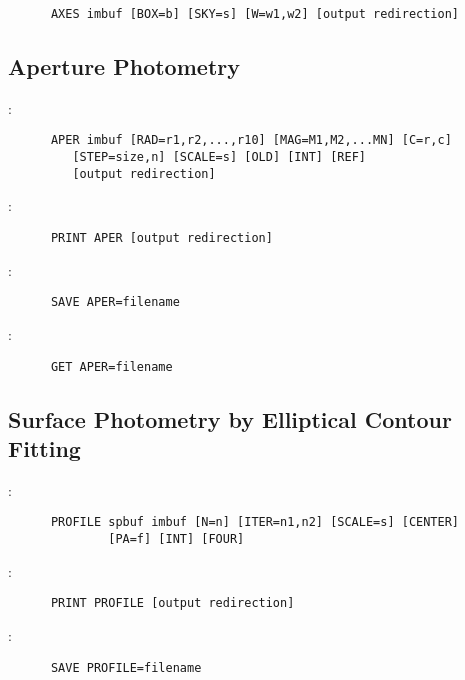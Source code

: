 \begin{verbatim}
      AXES imbuf [BOX=b] [SKY=s] [W=w1,w2] [output redirection]
\end{verbatim}

\subsection{Aperture Photometry}

:
\begin{verbatim}
      APER imbuf [RAD=r1,r2,...,r10] [MAG=M1,M2,...MN] [C=r,c]
		 [STEP=size,n] [SCALE=s] [OLD] [INT] [REF]
		 [output redirection]
\end{verbatim}

\noindent {}:
\begin{verbatim}
      PRINT APER [output redirection]
\end{verbatim}

\noindent {}:
\begin{verbatim}
      SAVE APER=filename
\end{verbatim}

\noindent {}:
\begin{verbatim}
      GET APER=filename
\end{verbatim}

\subsection{Surface Photometry by Elliptical Contour Fitting}

:
\begin{verbatim}
      PROFILE spbuf imbuf [N=n] [ITER=n1,n2] [SCALE=s] [CENTER]
			  [PA=f] [INT] [FOUR]
\end{verbatim}

\noindent {}:
\begin{verbatim}
      PRINT PROFILE [output redirection]
\end{verbatim}

\noindent {}:
\begin{verbatim}
      SAVE PROFILE=filename
\end{verbatim}

